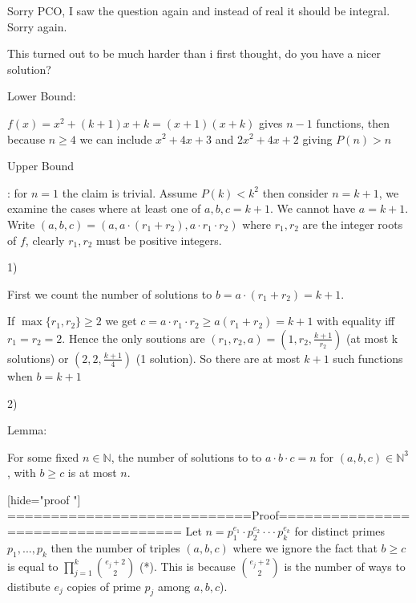 \begin{solution}
	Sorry PCO, I saw the question again and instead of real it should be integral. Sorry again.
\end{solution}



\begin{solution}
	This turned out to be much harder than i first thought, do you have a nicer solution?

\begin{bolded}Lower Bound:\end{bolded} $f(x)=x^2+(k+1)x+k = (x+1)(x+k)$ gives $n-1$ functions, then because $n\ge 4$ we can include $x^2+4x+3$ and $2x^2+4x+2$ giving $P(n)>n$

\begin{bolded}Upper Bound\end{bolded}: for $n=1$ the claim is trivial. Assume $P(k)<k^2$ then consider $n=k+1$, we examine the cases where at least one of $a,b,c=k+1$. We cannot have $a= k+1$. Write $(a,b,c)=(a,a\cdot (r_1+r_2),a\cdot r_1\cdot r_2)$ where $r_1,r_2$ are the integer roots of $f$, clearly $r_1,r_2$ must be positive integers.

\begin{bolded}1) \end{bolded} First we count the number of solutions to $b=a\cdot (r_1+r_2)=k+1$. 

If $\max\{r_1,r_2\}\ge 2$ we get $c =a\cdot r_1\cdot r_2 \ge a(r_1+r_2)=k+1$ with equality iff $r_1=r_2=2$. Hence the only soutions are $(r_1, r_2, a) = (1,r_2,\textstyle\frac{k+1}{r_2})$ (at most k solutions) or $(2,2, \frac{k+1}{4})$ (1 solution). So there are at most $k+1$ such functions when $b=k+1$

\begin{bolded}2) \end{bolded}
\begin{bolded}Lemma:\end{bolded} For some fixed $n\in \mathbb{N}$, the number of solutions to to $a\cdot b \cdot c = n$ for $(a,b,c)\in \mathbb{N}^3$, with $b\ge c$  is at most $n$. 

[hide="proof "]
============================Proof===================================
Let $n = p_1^{e_1}\cdot p_2^{e_2} \cdot \cdot \cdot p_k^{e_k}$ for distinct primes $p_1,...,p_k$ then the number of triples $(a,b,c)$ where we ignore the fact that $b\ge c$ is equal to $\prod_{j=1}^k \binom{e_j+2}{2}$ (*). This is because $\textstyle\binom{e_j+2}{2}$ is the number of ways to distibute $e_j$ copies of prime $p_j$ among $a,b,c$). 


\end{solution}
